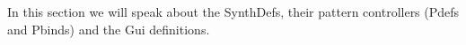 \documentclass[main.tex]{subfiles}
\begin{document}
In this section we will speak about the SynthDefs, their pattern controllers (Pdefs and Pbinds) and the Gui definitions.\\
\newpage
\end{document}
